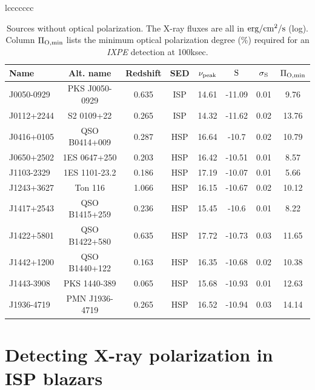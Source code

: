\begin{table}{lccccccc}
\caption{Sources without optical polarization. The X-ray fluxes are all in $\rm erg/cm^2/s$ (log). Column $\rm \Pi_{O,min}$ lists the minimum optical polarization degree (\%) required for an {\it IXPE} detection at 100ksec.}
\scriptsize
\begin{tabular}{lccccccc}
\toprule
Name & Alt. name & Redshift & SED & $\rm \nu_{peak}$  & $\rm S$  & $\rm \sigma_S$ & $\rm \Pi_{O,min}$ \\
\midrule
J0050-0929 & PKS J0050-0929 & 0.635 & ISP & 14.61 & -11.09 & 0.01 & 9.76  \\ 
J0112+2244 & S2 0109+22 & 0.265 & ISP & 14.32 & -11.62 & 0.02 & 13.76  \\ 
J0416+0105 & QSO B0414+009 & 0.287 & HSP & 16.64 & -10.7 & 0.02 & 10.79  \\ 
J0650+2502 & 1ES 0647+250 & 0.203 & HSP & 16.42 & -10.51 & 0.01 & 8.57  \\ 
J1103-2329 & 1ES 1101-23.2  & 0.186 & HSP & 17.19 & -10.07 & 0.01 & 5.66  \\ 
J1243+3627 & Ton 116 & 1.066 & HSP & 16.15 & -10.67 & 0.02 & 10.12  \\ 
J1417+2543 & QSO B1415+259 & 0.236 & HSP & 15.45 & -10.6 & 0.01 & 8.22  \\ 
J1422+5801 & QSO B1422+580 & 0.635 & HSP & 17.72 & -10.73 & 0.03 & 11.65  \\ 
J1442+1200 & QSO B1440+122 & 0.163 & HSP & 16.35 & -10.68 & 0.02 & 10.38  \\ 
J1443-3908 & PKS 1440-389 & 0.065 & HSP & 15.68 & -10.93 & 0.01 & 12.63  \\ 
J1936-4719 & PMN J1936-4719 & 0.265 & HSP & 16.52 & -10.94 & 0.03 & 14.14  \\  
\bottomrule
\end{tabular}
\label{tab:no_pol}
\end{table}



\section{Detecting X-ray polarization in ISP blazars}

